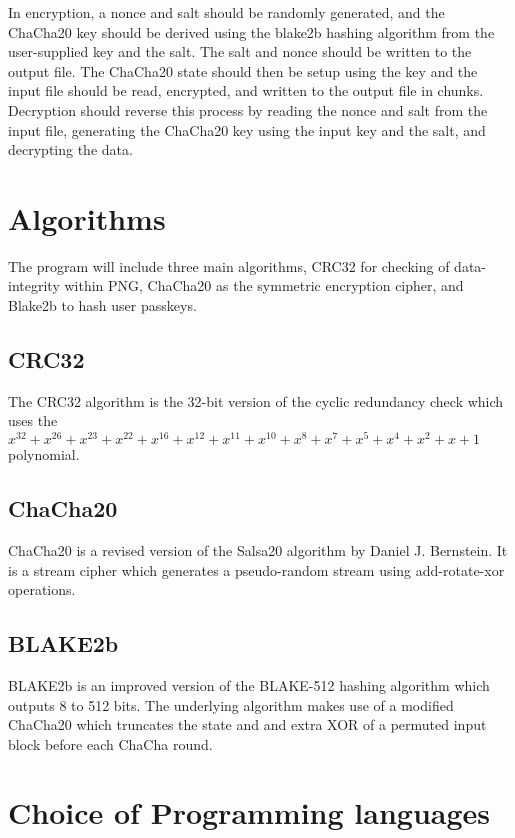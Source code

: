 \documentclass{report}
\begin{document}
In encryption, a nonce and salt should be randomly generated, and the ChaCha20 key should be derived using the blake2b hashing algorithm from the user-supplied key and the salt. The salt and nonce should be written to the output file. The ChaCha20 state should then be setup using the key and the input file should be read, encrypted, and written to the output file in chunks.
Decryption should reverse this process by reading the nonce and salt from the input file, generating the ChaCha20 key using the input key and the salt, and decrypting the data.

\section{Algorithms}

The program will include three main algorithms, CRC32 for checking of data-integrity within PNG, ChaCha20 as the symmetric encryption cipher, and Blake2b to hash user passkeys.

\subsection{CRC32}

The CRC32 algorithm is the 32-bit version of the cyclic redundancy check which uses the $x^{32}+x^{26}+x^{23}+x^{22}+x^{16}+x^{12}+x^{11}+x^{10}+x^8+x^7+x^5+x^4+x^2+x+1$ polynomial.

\subsection{ChaCha20}

ChaCha20 is a revised version of the Salsa20 algorithm \cite{salsa20} by Daniel J. Bernstein. It is a stream cipher which generates a pseudo-random stream using add-rotate-xor operations. 

\subsection{BLAKE2b}

BLAKE2b is an improved version of the BLAKE-512 hashing algorithm which outputs 8 to 512 bits. The underlying algorithm makes use of a modified ChaCha20 which truncates the state and and extra XOR of a permuted input block before each ChaCha round.

\section{Choice of Programming languages}
\end{document}
